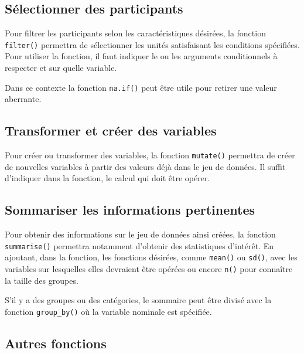 \documentclass[
]{book}
\begin{document}
\hypertarget{suxe9lectionner-des-participants}{%
\subsection{Sélectionner des participants}\label{suxe9lectionner-des-participants}}

Pour filtrer les participants selon les caractéristiques désirées, la fonction \texttt{filter()} permettra de sélectionner les unités satisfaisant les conditions spécifiées. Pour utiliser la fonction, il faut indiquer le ou les arguments conditionnels à respecter et sur quelle variable.

Dans ce contexte la fonction \texttt{na.if()} peut être utile pour retirer une valeur aberrante.

\hypertarget{transformer-et-cruxe9er-des-variables}{%
\subsection{Transformer et créer des variables}\label{transformer-et-cruxe9er-des-variables}}

Pour créer ou transformer des variables, la fonction \texttt{mutate()} permettra de créer de nouvelles variables à partir des valeurs déjà dans le jeu de données. Il suffit d'indiquer dans la fonction, le calcul qui doit être opérer.

\hypertarget{sommariser-les-informations-pertinentes}{%
\subsection{Sommariser les informations pertinentes}\label{sommariser-les-informations-pertinentes}}

Pour obtenir des informations sur le jeu de données ainsi créées, la fonction \texttt{summarise()} permettra notamment d'obtenir des statistiques d'intérêt. En ajoutant, dans la fonction, les fonctions désirées, comme \texttt{mean()} ou \texttt{sd()}, avec les variables sur lesquelles elles devraient être opérées ou encore \texttt{n()} pour connaître la taille des groupes.

S'il y a des groupes ou des catégories, le sommaire peut être divisé avec la fonction \texttt{group\_by()} où la variable nominale est spécifiée.

\hypertarget{autres-fonctions}{%
\subsection{Autres fonctions}\label{autres-fonctions}}
\end{document}
